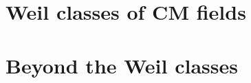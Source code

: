 \documentclass[11pt,reqno]{amsart}
\begin{document}
\part{Weil classes of CM fields}\label{part:cmfields}



\part{Beyond the Weil classes}\label{part:beyond}









\appendix
{}







\end{document}
